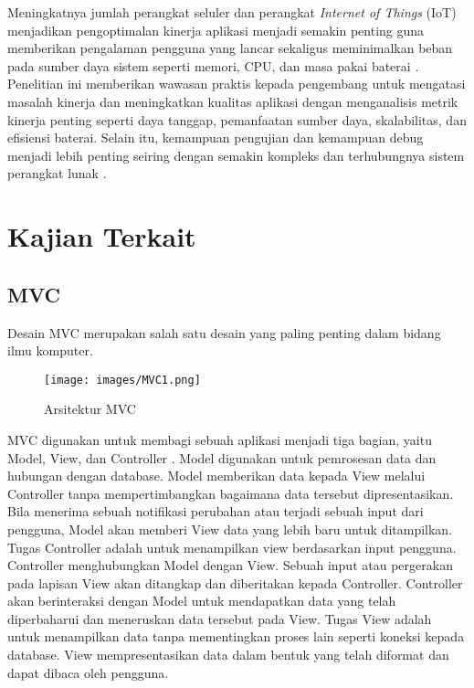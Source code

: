 \documentclass[conference]{IEEEtran}
\begin{document}
Meningkatnya jumlah perangkat seluler dan perangkat \textit{Internet of Things} (IoT) menjadikan pengoptimalan kinerja aplikasi menjadi semakin penting guna memberikan pengalaman pengguna yang lancar sekaligus meminimalkan beban pada sumber daya sistem seperti memori, CPU, dan masa pakai baterai \cite{Anhar_Swari_Aditiawan_2024}. Penelitian ini memberikan wawasan praktis kepada pengembang untuk mengatasi masalah kinerja dan meningkatkan kualitas aplikasi dengan menganalisis metrik kinerja penting seperti daya tanggap, pemanfaatan sumber daya, skalabilitas, dan efisiensi baterai. Selain itu, kemampuan pengujian dan kemampuan debug menjadi lebih penting seiring dengan semakin kompleks dan terhubungnya sistem perangkat lunak \cite{Gunawan_Lawi_Adnan_2016}.


 

\section{Kajian Terkait}
\subsection{MVC}
Desain MVC merupakan salah satu desain yang paling penting dalam bidang ilmu komputer\cite{bucanek2009model}.
\begin{figure}[h]
    \centering
    \texttt{[image: images/MVC1.png]}
    \caption{Arsitektur MVC}
    \label{fig:enter-label}
\end{figure}

MVC digunakan untuk membagi sebuah aplikasi menjadi tiga bagian, yaitu Model, View, dan Controller \cite{qureshi2014comparison}. Model digunakan untuk pemrosesan data dan hubungan dengan database. Model memberikan data kepada View melalui Controller tanpa mempertimbangkan bagaimana data tersebut dipresentasikan. Bila menerima sebuah notifikasi perubahan atau terjadi sebuah input dari pengguna, Model akan memberi View data yang lebih baru untuk ditampilkan. Tugas Controller adalah untuk menampilkan view berdasarkan input pengguna. Controller menghubungkan Model dengan View. Sebuah input atau pergerakan pada lapisan View akan ditangkap dan diberitakan kepada Controller. Controller akan berinteraksi dengan Model untuk mendapatkan data yang telah diperbaharui dan meneruskan data tersebut pada View. Tugas View adalah untuk menampilkan data tanpa mementingkan proses lain seperti koneksi kepada database. View mempresentasikan data dalam bentuk yang telah diformat dan dapat dibaca oleh pengguna.
\end{document}
